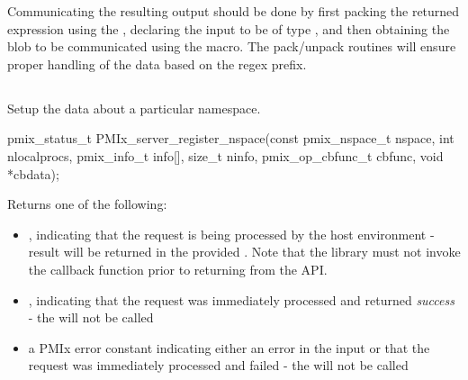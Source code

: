 Communicating the resulting output should be done by first packing the returned expression using the , declaring the input to be of type , and then obtaining the blob to be communicated using the  macro. The pack/unpack routines will ensure proper handling of the data based on the regex prefix.
\advicermend

\subsection{}

\summary

Setup the data about a particular namespace.

\format

\cspecificstart
\begin{codepar}
pmix_status_t
PMIx_server_register_nspace(const pmix_nspace_t nspace,
                            int nlocalprocs,
                            pmix_info_t info[], size_t ninfo,
                            pmix_op_cbfunc_t cbfunc,
                            void *cbdata);
\end{codepar}
\cspecificend

\begin{arglist}
\end{arglist}

Returns one of the following:

\begin{itemize}
    \item {}, indicating that the request is being processed by the host environment - result will be returned in the provided . Note that the library must not invoke the callback function prior to returning from the \ac{API}.
    \item {}, indicating that the request was immediately processed and returned \textit{success} - the  will not be called
    \item a PMIx error constant indicating either an error in the input or that the request was immediately processed and failed - the  will not be called
\end{itemize}

